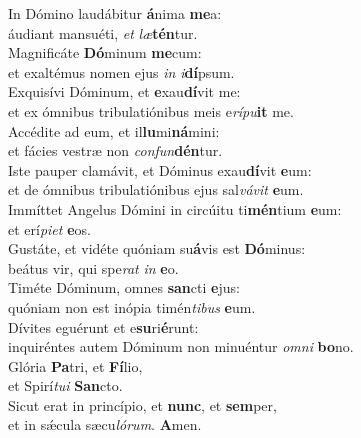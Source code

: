 \evenverse In Dómino laudábitur \textbf{á}nima \textbf{me}a:~\*\\
\evenverse áudiant mansuéti, \textit{et} \textit{læ}\textbf{tén}tur.\\
\oddverse Magnificáte \textbf{Dó}minum \textbf{me}cum:~\*\\
\oddverse et exaltémus nomen ejus \textit{in} \textit{i}\textbf{dí}psum.\\
\evenverse Exquisívi Dóminum, et \textbf{e}xau\textbf{dí}vit me:~\*\\
\evenverse et ex ómnibus tribulatiónibus meis e\textit{rí}\textit{pu}\textbf{it} me.\\
\oddverse Accédite ad eum, et il\textbf{lu}mi\textbf{ná}mini:~\*\\
\oddverse et fácies vestræ non \textit{con}\textit{fun}\textbf{dén}tur.\\
\evenverse Iste pauper clamávit, et Dóminus exau\textbf{dí}vit \textbf{e}um:~\*\\
\evenverse et de ómnibus tribulatiónibus ejus sal\textit{vá}\textit{vit} \textbf{e}um.\\
\oddverse Immíttet Angelus Dómini in circúitu ti\textbf{mén}tium \textbf{e}um:~\*\\
\oddverse et erí\textit{pi}\textit{et} \textbf{e}os.\\
\evenverse Gustáte, et vidéte quóniam su\textbf{á}vis est \textbf{Dó}minus:~\*\\
\evenverse beátus vir, qui spe\textit{rat} \textit{in} \textbf{e}o.\\
\oddverse Timéte Dóminum, omnes \textbf{san}cti \textbf{e}jus:~\*\\
\oddverse quóniam non est inópia timén\textit{ti}\textit{bus} \textbf{e}um.\\
\evenverse Dívites eguérunt et e\textbf{su}ri\textbf{é}runt:~\*\\
\evenverse inquiréntes autem Dóminum non minuéntur \textit{om}\textit{ni} \textbf{bo}no.\\
\oddverse Glória \textbf{Pa}tri, et \textbf{Fí}lio,~\*\\
\oddverse et Spirí\textit{tu}\textit{i} \textbf{San}cto.\\
\evenverse Sicut erat in princípio, et \textbf{nunc}, et \textbf{sem}per,~\*\\
\evenverse et in sǽcula sæcu\textit{ló}\textit{rum}. \textbf{A}men.\\
